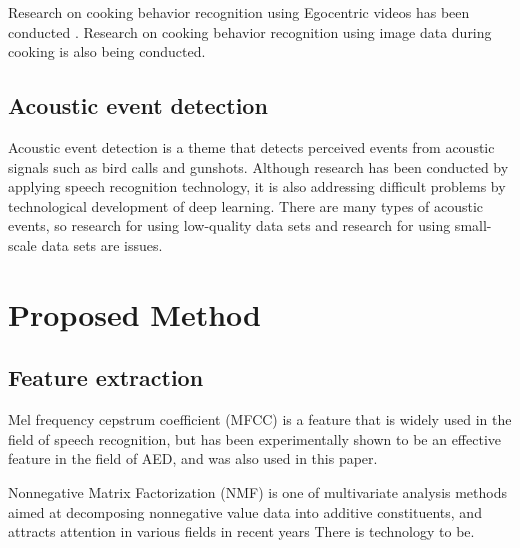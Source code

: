 \documentclass[sigchi]{acmart}
\begin{document}
Research on cooking behavior recognition using Egocentric videos has been conducted \cite{Urabe2018}.
Research on cooking behavior recognition using image data during cooking is also being conducted.\cite{Kuehne2014}
\subsection{Acoustic event detection}

Acoustic event detection is a theme that detects perceived events from acoustic signals such as bird calls and gunshots.
Although research has been conducted by applying speech recognition technology, it is also addressing difficult problems by technological development of deep learning.
There are many types of acoustic events, so research for using low-quality data sets and research for using small-scale data sets are issues\cite{Imoto2018}.

\section{Proposed Method}
\subsection{Feature extraction}

Mel frequency cepstrum coefficient (MFCC) is a feature that is widely used in the field of speech recognition, but has been experimentally shown to be an effective feature in the field of AED, and was also used in this paper.

Nonnegative Matrix Factorization (NMF) is one of multivariate analysis methods aimed at decomposing nonnegative value data into additive constituents, and attracts attention in various fields in recent years There is technology to be.
\end{document}
